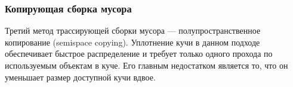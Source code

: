 


\subsubsection{Копирующая сборка мусора}

Третий метод трассирующей сборки мусора --- полупространственное копирование (semispace copying). Уплотнение кучи в данном подходе обеспечивает быстрое распределение и требует только одного прохода по используемым объектам в куче. Его главным недостатком является то, что он уменьшает размер доступной кучи вдвое. \cite{handbook}

